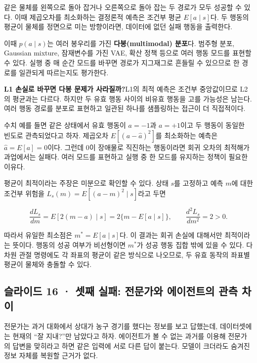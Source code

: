 \documentclass[11pt,a4paper]{article}
\begin{document}
같은 물체를 왼쪽으로 돌아 잡거나 오른쪽으로 돌아 잡는 두 경로가 모두 성공할 수 있다. 이때 제곱오차를 최소화하는 결정론적 예측은 조건부 평균 $E[a\mid s]$다. 두 행동의 평균이 물체를 정면으로 미는 방향이라면, 데이터에 없던 실패 행동을 출력한다.\par

이때 $p(a\mid s)$는 여러 봉우리를 가진 \textbf{다봉(multimodal) 분포}다. 범주형 분포, Gaussian mixture, 잠재변수를 가진 VAE, 확산 정책 등으로 여러 행동 모드를 표현할 수 있다. 실행 중 매 순간 모드를 바꾸면 경로가 지그재그로 흔들릴 수 있으므로 한 경로를 일관되게 따르는지도 평가한다.\par

\par\medskip\noindent\textbf{L1 손실로 바꾸면 다봉 문제가 사라질까?}\quad L1의 최적 예측은 조건부 중앙값이므로 L2의 평균과는 다르다. 하지만 두 유효 행동 사이의 비유효 행동을 고를 가능성은 남는다. 여러 행동 경로를 분포로 표현하고 일관된 하나를 샘플링하는 접근이 더 직접적이다.\par

수치 예를 들면 같은 상태에서 유효 행동이 $a=-1$과 $a=+1$이고 두 행동이 동일한 빈도로 관측되었다고 하자. 제곱오차 $E[(a-\hat a)^2]$를 최소화하는 예측은 $\hat a=E[a]=0$이다. 그런데 $0$이 장애물로 직진하는 행동이라면 회귀 오차의 최적해가 과업에서는 실패다. 여러 모드를 표현하고 실행 중 한 모드를 유지하는 정책이 필요한 이유다.\par

평균이 최적이라는 주장은 미분으로 확인할 수 있다. 상태 $s$를 고정하고 예측 $m$에 대한 조건부 위험을 $L_s(m)=E[(a-m)^2\mid s]$라고 두면\par

\[
\frac{dL_s}{dm}=E[2(m-a)\mid s]
=2\{m-E[a\mid s]\},\qquad
\frac{d^2L_s}{dm^2}=2>0.
\]

따라서 유일한 최소점은 $m^*=E[a\mid s]$다. 이 결과는 회귀 손실에 대해서만 최적이라는 뜻이다. 행동의 성공 여부가 비선형이면 $m^*$가 성공 행동 집합 밖에 있을 수 있다. 다차원 관절 명령에도 각 좌표의 평균이 같은 방식으로 나오므로, 두 유효 동작의 좌표별 평균이 물체와 충돌할 수 있다.\par

\subsection{슬라이드 16 · 셋째 실패: 전문가와 에이전트의 관측 차이}

전문가는 과거 대화에서 상대가 농구 경기를 했다는 정보를 보고 답했는데, 데이터셋에는 현재의 “잘 지내?”만 남았다고 하자. 에이전트가 볼 수 없는 과거를 이용해 전문가의 답변을 맞히라고 하면 같은 입력에 서로 다른 답이 붙는다. 모델이 크더라도 숨겨진 정보 자체를 복원할 근거가 없다.\par
\end{document}
